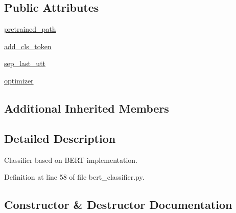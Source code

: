 \subsection*{Public Attributes}
\begin{DoxyCompactItemize}
\item 
\hyperlink{classparlai_1_1agents_1_1bert__classifier_1_1bert__classifier_1_1BertClassifierAgent_a27d04268a995c5f8aad0061dff4b2b13}{pretrained\+\_\+path}
\item 
\hyperlink{classparlai_1_1agents_1_1bert__classifier_1_1bert__classifier_1_1BertClassifierAgent_a23a9fab5a21c9ee44ab416476b7f0361}{add\+\_\+cls\+\_\+token}
\item 
\hyperlink{classparlai_1_1agents_1_1bert__classifier_1_1bert__classifier_1_1BertClassifierAgent_a4cfb560c49609df56c6867623cfb06d2}{sep\+\_\+last\+\_\+utt}
\item 
\hyperlink{classparlai_1_1agents_1_1bert__classifier_1_1bert__classifier_1_1BertClassifierAgent_a5cd45872525e6bd69c29f1cadfa675ed}{optimizer}
\end{DoxyCompactItemize}
\subsection*{Additional Inherited Members}


\subsection{Detailed Description}
\begin{DoxyVerb}Classifier based on BERT implementation.\end{DoxyVerb}
 

Definition at line 58 of file bert\+\_\+classifier.\+py.



\subsection{Constructor \& Destructor Documentation}
\mbox{\label{classparlai_1_1agents_1_1bert__classifier_1_1bert__classifier_1_1BertClassifierAgent_ac05f1d52c400de5b60284121b4a49746}} 
